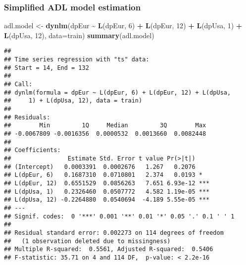 \documentclass[]{article}
\newenvironment{Shaded}{\begin{snugshade}}{\end{snugshade}}
\newcommand{\DataTypeTok}[1]{\textcolor[rgb]{0.13,0.29,0.53}{#1}}
\newcommand{\DecValTok}[1]{\textcolor[rgb]{0.00,0.00,0.81}{#1}}
\newcommand{\KeywordTok}[1]{\textcolor[rgb]{0.13,0.29,0.53}{\textbf{#1}}}
\newcommand{\NormalTok}[1]{#1}
\newcommand{\OperatorTok}[1]{\textcolor[rgb]{0.81,0.36,0.00}{\textbf{#1}}}
\newcommand{\StringTok}[1]{\textcolor[rgb]{0.31,0.60,0.02}{#1}}
\begin{document}
\hypertarget{simplified-adl-model-estimation}{%
\subsubsection{Simplified ADL model
estimation}\label{simplified-adl-model-estimation}}

\begin{Shaded}
\begin{Highlighting}[]
\NormalTok{adl.model \textless{}{-}}\StringTok{ }\KeywordTok{dynlm}\NormalTok{(dpEur }\OperatorTok{\textasciitilde{}}\StringTok{ }\KeywordTok{L}\NormalTok{(dpEur, }\DecValTok{6}\NormalTok{) }\OperatorTok{+}\StringTok{ }\KeywordTok{L}\NormalTok{(dpEur, }\DecValTok{12}\NormalTok{) }\OperatorTok{+}\StringTok{ }\KeywordTok{L}\NormalTok{(dpUsa, }\DecValTok{1}\NormalTok{) }\OperatorTok{+}\StringTok{ }\KeywordTok{L}\NormalTok{(dpUsa, }\DecValTok{12}\NormalTok{), }\DataTypeTok{data=}\NormalTok{train)}
\KeywordTok{summary}\NormalTok{(adl.model)}
\end{Highlighting}
\end{Shaded}

\begin{verbatim}
## 
## Time series regression with "ts" data:
## Start = 14, End = 132
## 
## Call:
## dynlm(formula = dpEur ~ L(dpEur, 6) + L(dpEur, 12) + L(dpUsa, 
##     1) + L(dpUsa, 12), data = train)
## 
## Residuals:
##        Min         1Q     Median         3Q        Max 
## -0.0067809 -0.0016356  0.0000532  0.0013660  0.0082448 
## 
## Coefficients:
##                Estimate Std. Error t value Pr(>|t|)    
## (Intercept)   0.0003391  0.0002676   1.267   0.2076    
## L(dpEur, 6)   0.1687310  0.0710801   2.374   0.0193 *  
## L(dpEur, 12)  0.6551529  0.0856263   7.651 6.93e-12 ***
## L(dpUsa, 1)   0.2326460  0.0507772   4.582 1.19e-05 ***
## L(dpUsa, 12) -0.2264880  0.0540694  -4.189 5.55e-05 ***
## ---
## Signif. codes:  0 '***' 0.001 '**' 0.01 '*' 0.05 '.' 0.1 ' ' 1
## 
## Residual standard error: 0.002273 on 114 degrees of freedom
##   (1 observation deleted due to missingness)
## Multiple R-squared:  0.5561, Adjusted R-squared:  0.5406 
## F-statistic: 35.71 on 4 and 114 DF,  p-value: < 2.2e-16
\end{verbatim}
\end{document}
